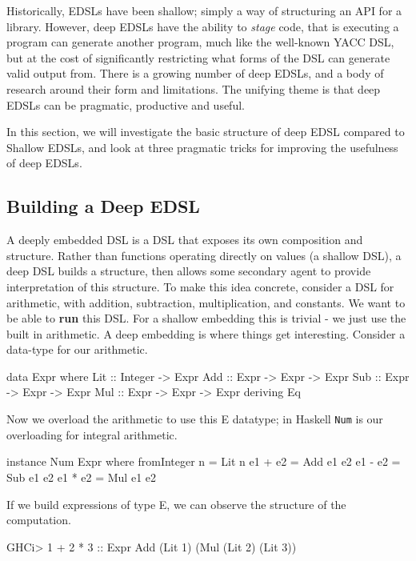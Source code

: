 \documentclass[11pt]{article}
\begin{document}
Historically, EDSLs have been shallow; simply a way of structuring an API for a library. 
However, deep EDSLs have the ability to {\em stage\/} code, that is executing a program
can generate another program, much like the well-known YACC DSL,
but at the cost of significantly restricting what forms of the DSL can
generate valid output from.
There is a growing number of deep EDSLs, and a body of research around their
form and limitations.
The unifying theme is that deep EDSLs can be pragmatic, productive and useful.

In this section, we will investigate the basic structure of deep EDSL compared to Shallow EDSLs,
and look at three pragmatic tricks for improving the usefulness of deep EDSLs.

\subsection{Building a Deep EDSL}

A deeply embedded DSL is a DSL that exposes its own composition and structure.
Rather than functions operating directly on values (a shallow DSL),
a deep DSL builds a structure, then allows some secondary agent to
provide interpretation of this structure.
To make this idea concrete, consider a DSL for arithmetic,
with addition, subtraction, multiplication, and constants.
We want to be able to {\bf run\/} this DSL. For a shallow
embedding this is trivial - we just use the built in 
arithmetic. A deep embedding is where things get
interesting. Consider a data-type for our arithmetic.

\begin{Code}
data Expr where
 Lit :: Integer -> Expr
 Add :: Expr -> Expr -> Expr
 Sub :: Expr -> Expr -> Expr
 Mul :: Expr -> Expr -> Expr
 deriving Eq
\end{Code}

Now we overload the arithmetic to use this E datatype;
in Haskell \verb|Num| is our overloading for integral arithmetic.

\begin{Code}
instance Num Expr where
  fromInteger n = Lit n
  e1 + e2 = Add e1 e2
  e1 - e2 = Sub e1 e2
  e1 * e2 = Mul e1 e2
\end{Code}

If we build expressions of type E, we can
observe the structure of the computation.
\begin{Code}
GHCi> 1 + 2 * 3 :: Expr
Add (Lit 1) (Mul (Lit 2) (Lit 3))
\end{Code}
\end{document}
